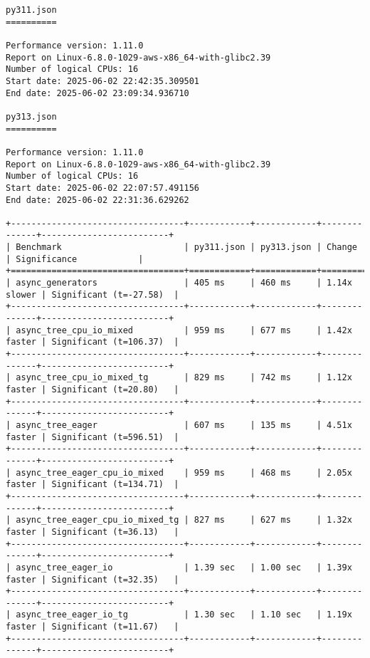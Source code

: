 \begin{code}
    \begin{verbatim}
py311.json
==========

Performance version: 1.11.0
Report on Linux-6.8.0-1029-aws-x86_64-with-glibc2.39
Number of logical CPUs: 16
Start date: 2025-06-02 22:42:35.309501
End date: 2025-06-02 23:09:34.936710

py313.json
==========

Performance version: 1.11.0
Report on Linux-6.8.0-1029-aws-x86_64-with-glibc2.39
Number of logical CPUs: 16
Start date: 2025-06-02 22:07:57.491156
End date: 2025-06-02 22:31:36.629262

+----------------------------------+------------+------------+--------------+-------------------------+
| Benchmark                        | py311.json | py313.json | Change       | Significance            |
+==================================+============+============+==============+=========================+
| async_generators                 | 405 ms     | 460 ms     | 1.14x slower | Significant (t=-27.58)  |
+----------------------------------+------------+------------+--------------+-------------------------+
| async_tree_cpu_io_mixed          | 959 ms     | 677 ms     | 1.42x faster | Significant (t=106.37)  |
+----------------------------------+------------+------------+--------------+-------------------------+
| async_tree_cpu_io_mixed_tg       | 829 ms     | 742 ms     | 1.12x faster | Significant (t=20.80)   |
+----------------------------------+------------+------------+--------------+-------------------------+
| async_tree_eager                 | 607 ms     | 135 ms     | 4.51x faster | Significant (t=596.51)  |
+----------------------------------+------------+------------+--------------+-------------------------+
| async_tree_eager_cpu_io_mixed    | 959 ms     | 468 ms     | 2.05x faster | Significant (t=134.71)  |
+----------------------------------+------------+------------+--------------+-------------------------+
| async_tree_eager_cpu_io_mixed_tg | 827 ms     | 627 ms     | 1.32x faster | Significant (t=36.13)   |
+----------------------------------+------------+------------+--------------+-------------------------+
| async_tree_eager_io              | 1.39 sec   | 1.00 sec   | 1.39x faster | Significant (t=32.35)   |
+----------------------------------+------------+------------+--------------+-------------------------+
| async_tree_eager_io_tg           | 1.30 sec   | 1.10 sec   | 1.19x faster | Significant (t=11.67)   |
+----------------------------------+------------+------------+--------------+-------------------------+

\end{verbatim}
\end{code}
